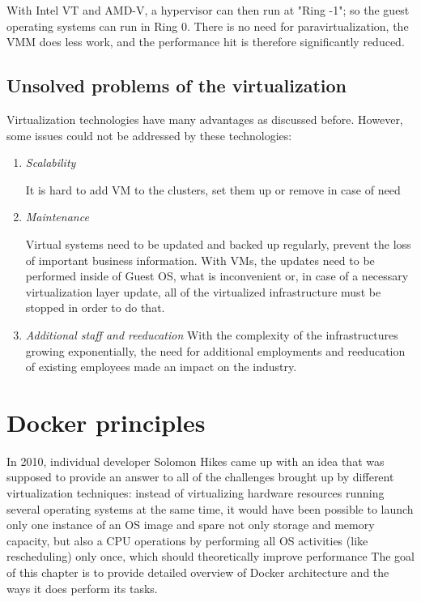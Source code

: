 With Intel VT and AMD-V, a hypervisor can then run at "Ring -1";
so the guest operating systems can run in Ring 0.
There is no need for paravirtualization,
the VMM does less work, and
the performance hit is therefore significantly reduced.

\subsection{Unsolved problems of the virtualization}

Virtualization technologies have many advantages as discussed before.
However, some issues could not be addressed by these technologies:
\begin{enumerate}
\item \textit{Scalability}

It is hard to add VM to the clusters,
set them up or remove in case
of need

\item \textit{Maintenance}

Virtual systems need to be updated and backed up regularly,
prevent the loss of important business information.
With VMs, the updates need to be performed inside of Guest OS,
what is inconvenient or, in case of a necessary virtualization layer update,
all of the virtualized infrastructure must be stopped in order to do that.

\item \textit{Additional staff and reeducation}
With the complexity of the infrastructures
growing exponentially, the need for additional
employments and reeducation of existing employees
made an impact on the industry\cite{VirtualizationProblems}.
\end{enumerate}

\section{Docker principles}

In 2010, individual developer Solomon Hikes came up with an idea that was
supposed to provide an answer to all of the challenges brought up by different
virtualization techniques: instead of virtualizing hardware resources running
several operating systems at the same time, it would have been possible
to launch only one instance of an OS image and spare not only storage and memory capacity,
but also a CPU operations by performing all
OS activities (like rescheduling) only once, which should theoretically
improve performance
The goal of this chapter is to provide detailed overview of Docker architecture
and the ways it does perform its tasks.

